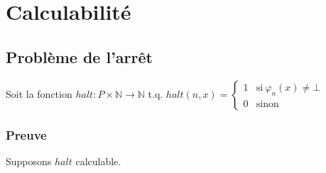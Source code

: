 \section{Calculabilité}

\subsection{Problème de l'arrêt}

Soit la fonction $halt : P \times \mathbb{N} \rightarrow \mathbb{N}$ t.q. $halt(n,x) =
\begin{cases}
	1 & \text{si}\ \varphi_n(x) \neq \bot\\
	0 & \text{sinon}
\end{cases}$


\subsubsection{Preuve}

Supposons $halt$ calculable.

